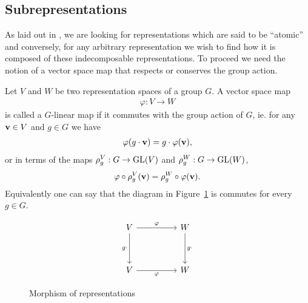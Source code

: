 \subsection{Subrepresentations}\label{sect:subrepr}

As laid out in \cite{FultonHarris}, we are looking for representations which are said to be ``atomic'' and conversely, for any arbitrary representation we wish to find how it is composed of these indecomposable representations. To proceed we need the notion of a vector space map that respects or conserves the group action.	

\begin{definition}\cite{FultonHarris}
	Let $V$ and $W$ be two representation spaces of a group $G$. A vector space map 
	\begin{align*}
		\varphi: V \rightarrow W
	\end{align*} 
	is called a $G$-linear map if it commutes with the group action of $G$, ie. for any $\mathbf{v} \in V$ and $g \in G$ we have
	\begin{align*}
		\varphi( g \cdot \mathbf{v} ) = g \cdot \varphi (\mathbf{v}),
	\end{align*}
	or in terms of the maps $\rho_g^V: G \rightarrow \text{GL}(V)$ and $\rho_g^W: G \rightarrow \text{GL}(W)$,
	\begin{align*}
		\varphi \circ \rho^V_g (\mathbf{v}) = \rho^W_g \circ \varphi (\mathbf{v}).
	\end{align*}
	Equivalently one can say that the diagram in Figure~\ref*{fig:commapmorp} is commutes for every $g \in G$.
	\begin{figure}[hbt!]
		\centering
		\[\begin{tikzcd}
			V && W \\
			\\
			V && W
			\arrow["\varphi", from=1-1, to=1-3]
			\arrow["g\cdot"', from=1-1, to=3-1]
			\arrow["g\cdot", from=1-3, to=3-3]
			\arrow["\varphi"', from=3-1, to=3-3]
		\end{tikzcd}\]
		\caption{Morphism of representations}
		\label{fig:commapmorp}
	\end{figure}
\end{definition}

